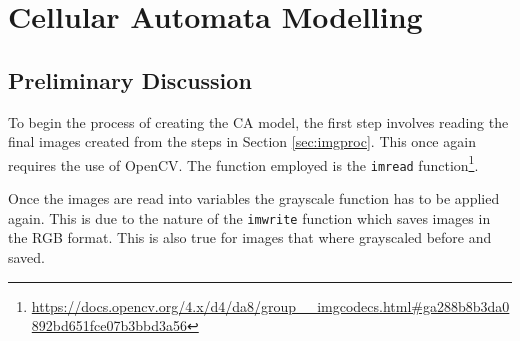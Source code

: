 \section{Cellular Automata Modelling}
\subsection{Preliminary Discussion}
To begin the process of creating the CA model, the first step involves reading the final images created from the steps in Section \ref{sec:imgproc}. This once again requires the use of OpenCV. The function employed is the \texttt{imread} function\footnote{\url{https://docs.opencv.org/4.x/d4/da8/group__imgcodecs.html\#ga288b8b3da0892bd651fce07b3bbd3a56}}.

Once the images are read into variables the grayscale function has to be applied again. This is due to the nature of the \texttt{imwrite} function which saves images in the RGB format. This is also true for images that where grayscaled before and saved.

